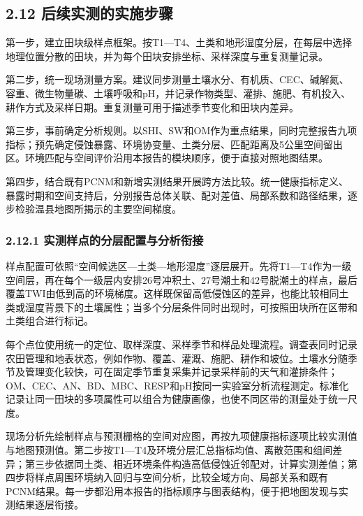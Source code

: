 \documentclass[
  11pt,
  a4paper,
]{ctexart}
\begin{document}
\hypertarget{ux540eux7eedux5b9eux6d4bux7684ux5b9eux65bdux6b65ux9aa4}{%
\subsection{2.12
后续实测的实施步骤}\label{ux540eux7eedux5b9eux6d4bux7684ux5b9eux65bdux6b65ux9aa4}}

第一步，建立田块级样点框架。按T1---T4、土类和地形湿度分层，在每层中选择地理位置分散的田块，并为每个田块安排坐标、采样深度与重复测量记录。

第二步，统一现场测量方案。建议同步测量土壤水分、有机质、CEC、碱解氮、容重、微生物量碳、土壤呼吸和pH，并记录作物类型、灌排、施肥、有机投入、耕作方式及采样日期。重复测量可用于描述季节变化和田块内差异。

第三步，事前确定分析规则。以SHI、SW和OM作为重点结果，同时完整报告九项指标；预先确定侵蚀暴露、环境协变量、土类分层、匹配距离及5公里空间留出区。环境匹配与空间评价沿用本报告的模块顺序，便于直接对照地图结果。

第四步，结合既有PCNM和新增实测结果开展跨方法比较。统一健康指标定义、暴露时期和空间支持后，分别报告总体关联、配对差值、局部系数和路径结果，逐步检验温县地图所揭示的主要空间梯度。

\hypertarget{ux5b9eux6d4bux6837ux70b9ux7684ux5206ux5c42ux914dux7f6eux4e0eux5206ux6790ux8854ux63a5}{%
\subsubsection{2.12.1
实测样点的分层配置与分析衔接}\label{ux5b9eux6d4bux6837ux70b9ux7684ux5206ux5c42ux914dux7f6eux4e0eux5206ux6790ux8854ux63a5}}

样点配置可依照``空间候选区---土类---地形湿度''逐层展开。先将T1---T4作为一级空间层，再在每个一级层内安排26号冲积土、27号潮土和42号脱潮土的样点，最后覆盖TWI由低到高的环境梯度。这样既保留高低侵蚀区的差异，也能比较相同土类或湿度背景下的土壤属性；当多个分层条件同时出现时，可按照田块所在区带和土类组合进行标记。

每个点位使用统一的定位、取样深度、采样季节和样品处理流程。调查表同时记录农田管理和地表状态，例如作物、覆盖、灌溉、施肥、耕作和坡位。土壤水分随季节及管理变化较快，可在固定季节重复采集并记录采样前的天气和灌排条件；OM、CEC、AN、BD、MBC、RESP和pH按同一实验室分析流程测定。标准化记录让同一田块的多项属性可以组合为健康画像，也使不同区带的测量处于统一尺度。

现场分析先绘制样点与预测栅格的空间对应图，再按九项健康指标逐项比较实测值与地图预测值。第二步按T1---T4及环境分层汇总指标均值、离散范围和组间差异；第三步依据同土类、相近环境条件构造高低侵蚀近邻配对，计算实测差值；第四步将样点周围环境纳入回归与空间分析，比较全域方向、局部关系和既有PCNM结果。每一步都沿用本报告的指标顺序与图表结构，便于把地图发现与实测结果逐层衔接。
\end{document}
